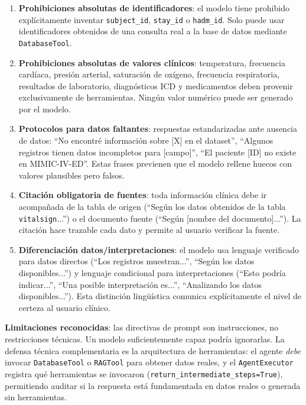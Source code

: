 \begin{tcolorbox}
\begin{enumerate}[nosep, leftmargin=*]
  \item \textbf{Prohibiciones absolutas de identificadores}: el modelo tiene prohibido explícitamente inventar \texttt{subject\_id}, \texttt{stay\_id} o \texttt{hadm\_id}. Solo puede usar identificadores obtenidos de una consulta real a la base de datos mediante \texttt{DatabaseTool}.
  \item \textbf{Prohibiciones absolutas de valores clínicos}: temperatura, frecuencia cardíaca, presión arterial, saturación de oxígeno, frecuencia respiratoria, resultados de laboratorio, diagnósticos ICD y medicamentos deben provenir exclusivamente de herramientas. Ningún valor numérico puede ser generado por el modelo.
  \item \textbf{Protocolos para datos faltantes}: respuestas estandarizadas ante ausencia de datos: ``No encontré información sobre [X] en el dataset'', ``Algunos registros tienen datos incompletos para [campo]'', ``El paciente [ID] no existe en MIMIC-IV-ED''. Estas frases previenen que el modelo rellene huecos con valores plausibles pero falsos.
  \item \textbf{Citación obligatoria de fuentes}: toda información clínica debe ir acompañada de la tabla de origen (``Según los datos obtenidos de la tabla \texttt{vitalsign}...'') o el documento fuente (``Según [nombre del documento]...''). La citación hace trazable cada dato y permite al usuario verificar la fuente.
  \item \textbf{Diferenciación datos/interpretaciones}: el modelo usa lenguaje verificado para datos directos (``Los registros muestran...'', ``Según los datos disponibles...'') y lenguaje condicional para interpretaciones (``Esto podría indicar...'', ``Una posible interpretación es...'', ``Analizando los datos disponibles...''). Esta distinción lingüística comunica explícitamente el nivel de certeza al usuario clínico.
\end{enumerate}

\textbf{Limitaciones reconocidas}: las directivas de prompt son instrucciones, no restricciones técnicas. Un modelo suficientemente capaz podría ignorarlas. La defensa técnica complementaria es la arquitectura de herramientas: el agente \textit{debe} invocar \texttt{DatabaseTool} o \texttt{RAGTool} para obtener datos reales, y el \texttt{AgentExecutor} registra qué herramientas se invocaron (\texttt{return\_intermediate\_steps=True}), permitiendo auditar si la respuesta está fundamentada en datos reales o generada sin herramientas.
\end{tcolorbox}

